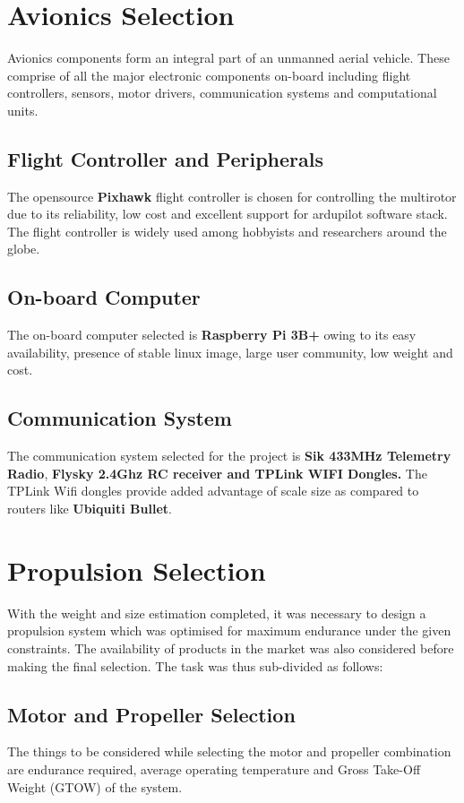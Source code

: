 \begin{spacing}{2}
\begin{table}[h]
    \label{tab:loadest}
\end{table}
\section{Avionics Selection}
Avionics components form an integral part of an unmanned aerial vehicle. These comprise of all the major electronic components on-board including flight controllers, sensors, motor drivers, communication systems and computational units.
\subsection{Flight Controller and Peripherals}
The opensource \textbf{Pixhawk} flight controller is chosen for controlling the multirotor due to its reliability, low cost and excellent support for ardupilot software stack. The flight controller is widely used among hobbyists and researchers around the globe.
\subsection{On-board Computer}
The on-board computer selected is \textbf{Raspberry Pi 3B+} owing to its easy availability, presence of stable linux image, large user community, low weight and cost.
\subsection{Communication System}
The communication system selected for the project is \textbf{Sik 433MHz Telemetry Radio}, \textbf{Flysky 2.4Ghz RC receiver and TPLink WIFI Dongles.}
The TPLink Wifi dongles provide added advantage of scale size as compared to routers like \textbf{Ubiquiti Bullet}.
\section{Propulsion Selection} 
With the weight and size estimation completed, it was necessary to design a
propulsion system which was optimised for maximum endurance under the given
constraints. The availability of products in the market was also considered before
making the final selection. The task was thus sub-divided as follows:
\subsection{Motor and Propeller Selection}
The things to be considered while selecting the motor and propeller combination are
endurance required, average operating temperature and Gross Take-Off Weight (GTOW) of
the system.


\end{spacing}
